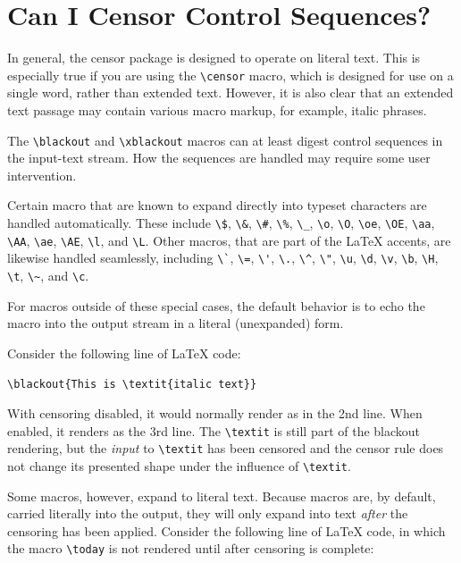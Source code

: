 \documentclass{article}
\begin{document}
\section{Can I Censor Control Sequences?\label{S:A}}

In general, the \textsf{censor} package is designed to operate on
  literal text.
This is especially true if you are using the \verb|\censor| macro, which
  is designed for use on a single word, rather than extended text.
However, it is also clear that an extended text passage may contain 
  various macro markup, for example, italic phrases.

The \verb|\blackout| and \verb|\xblackout| macros can at least digest
  control sequences in the input-text stream.
How the sequences are handled may require some user intervention.

Certain macro that are known to expand directly into typeset characters
  are handled automatically.
These include \verb|\$|, \verb|\&|, \verb|\#|, \verb|\%|, \verb|\_|, 
  \verb|\o|, \verb|\O|, \verb|\oe|, \verb|\OE|, \verb|\aa|, \verb|\AA|, 
  \verb|\ae|, \verb|\AE|, \verb|\l|, and \verb|\L|.
Other macros, that are part of the \LaTeX{} accents, are likewise
  handled seamlessly, including \verb|\`|,  \verb|\=|, \verb|\'|,
  \verb|\.|, \verb|\^|, \verb|\"|, \verb|\u|, \verb|\d|, \verb|\v|,
  \verb|\b|, \verb|\H|, \verb|\t|, \verb|\~|, and \verb|\c|.

For macros outside of these special cases, the default behavior is
  to echo the macro into the output stream in a literal
  (unexpanded) form.

Consider the following line of \LaTeX{} code:

\verb|\blackout{This is \textit{italic text}}|\\

With censoring disabled, it would normally render as in the 2nd line.  
When enabled, it renders as the 3rd line.
The \verb|\textit| is still part of the blackout rendering, but the 
  \textit{input} to \verb|\textit| has been censored and the
  censor rule does not change its presented shape under the influence
  of \verb|\textit|.

Some macros, however, expand to literal text.
Because macros are, by default, carried literally into the output, they
  will only expand into text \textit{after} the censoring has been 
  applied.
Consider the following line of \LaTeX{} code, in which the macro
  \verb|\today| is not rendered until after censoring is complete:
\end{document}
